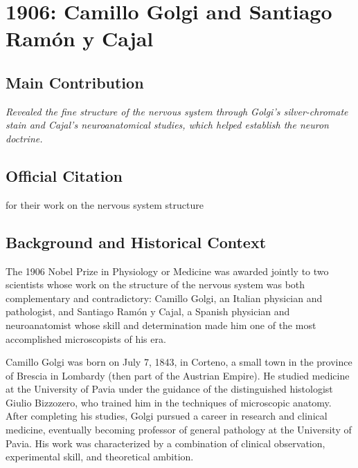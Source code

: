 \chapter[1906 --- Cajal]{1906: Camillo Golgi and Santiago Ram\'on y Cajal}
\label{ch:1906_Golgi_Cajal}

\section*{Main Contribution}

\textit{Revealed the fine structure of the nervous system through Golgi's silver-chromate stain and Cajal's neuroanatomical studies, which helped establish the neuron doctrine.}\cite{nobel-1906,lecture-1906}

\section{Official Citation}

for their work on the nervous system structure

\section{Background and Historical Context}

The 1906 Nobel Prize in Physiology or Medicine was awarded jointly to two scientists whose work on the structure of the nervous system was both complementary and contradictory: Camillo Golgi, an Italian physician and pathologist, and Santiago Ram\'on y Cajal, a Spanish physician and neuroanatomist whose skill and determination made him one of the most accomplished microscopists of his era.\cite{golgi-cajal-history}

Camillo Golgi was born on July 7, 1843, in Corteno, a small town in the province of Brescia in Lombardy (then part of the Austrian Empire). He studied medicine at the University of Pavia under the guidance of the distinguished histologist Giulio Bizzozero, who trained him in the techniques of microscopic anatomy. After completing his studies, Golgi pursued a career in research and clinical medicine, eventually becoming professor of general pathology at the University of Pavia. His work was characterized by a combination of clinical observation, experimental skill, and theoretical ambition.

